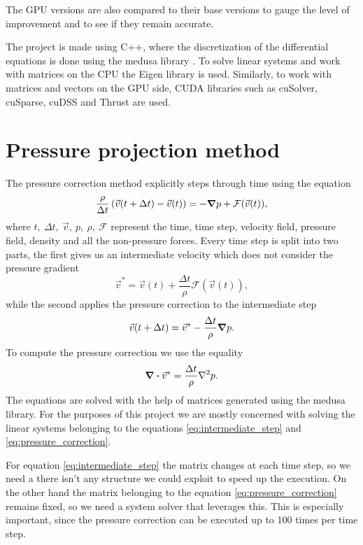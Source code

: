 \documentclass{article}
\begin{document}
The GPU versions are also compared to their base versions to gauge the level of improvement and to 
see if they remain accurate.

The project is made using C++, where the discretization of the differential equations is done using 
the medusa library \cite{medusa}. To solve linear systems and work with matrices on the CPU the 
Eigen library is used. Similarly, to work with matrices and vectors on the GPU side, 
CUDA libraries such as cuSolver, cuSparse, cuDSS and Thrust are used.
\section{Pressure projection method}
The pressure correction method explicitly steps through time using the equation 
\begin{equation}
    \frac{\rho}{\Delta t} \left( \vec{v}(t + \Delta t) - \vec{v}(t)
    \right) =
    -\grad p + \mathcal{F}(\vec{v}(t)),
\end{equation}
where \(t,~\Delta t,~\vec{v},~p,~\rho,~\mathcal{F}\) represent the time, time step, velocity 
field, pressure field, density and all the non-pressure forces. 
Every time step is split into two parts, the first gives us an intermediate velocity
which does not consider the pressure gradient
\begin{equation}
    \label{eq:intermediate_step}
    \vec{v}^* = \vec{v}(t) + \frac{\Delta t}{\rho}
        \mathcal{F}(\vec{v}(t)),
\end{equation}
while the second applies the pressure correction to the intermediate step
\begin{equation}
    \vec{v}(t + \Delta t) = \vec{v}^* -\frac{\Delta t}{\rho} \grad p.
\end{equation}
To compute the pressure correction we use the equality
\begin{equation}
    \label{eq:pressure_correction}
    \div \vec{v}^*
        = \frac{\Delta t}{\rho}\laplacian p.
\end{equation}
The equations are solved with the help of matrices generated using the medusa library.
For the purposes of this project we are mostly concerned with solving the linear 
systems belonging to the equations \ref{eq:intermediate_step} and \ref{eq:pressure_correction}.

For equation \ref{eq:intermediate_step} the matrix changes at each time step, so we need 
a there isn't any structure we could exploit to speed up the execution. On the other hand 
the matrix belonging to the equation \ref{eq:pressure_correction} remains fixed, so 
we need a system solver that leverages this. This is especially important, since 
the pressure correction can be executed up to 100 times per time step.
\end{document}
